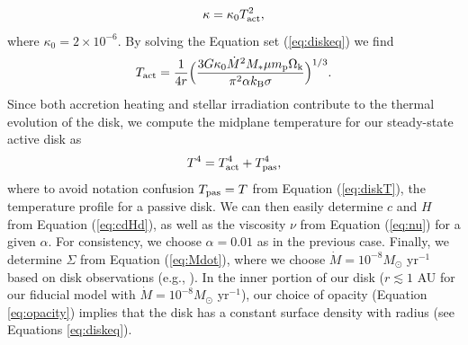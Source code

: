 \documentclass[apj]{emulateapj}
\begin{document}
\begin{equation}
\label{eq:opacity}
\kappa=\kappa_0 T_{\rm act}^2,
\end{equation}
where $\kappa_0=2 \times 10^{-6}$. By solving the Equation set (\ref{eq:diskeq}) we find
\begin{equation}
\label{eq:Tdact}
T_{\rm act}=\frac{1}{4 r} \Big(\frac{3 G \kappa_0\dot{M}^2 M_* \mu m_{\rm p} \Omega_{\rm k}}{\pi^2 \alpha k_{\rm B} \sigma}\Big)^{1/3}.
\end{equation}
Since both accretion heating and stellar irradiation contribute to the thermal evolution of the disk, we compute the midplane temperature for our steady-state active disk as
\begin{equation}
\label{eq:activeT}
T^4 = T_{\rm act}^4 + T_{\rm pas}^4,
\end{equation}
where to avoid notation confusion $T_{\rm pas}=T$ from Equation (\ref{eq:diskT}), the temperature profile for a passive disk. We can then easily determine  $c$ and $H$ from Equation (\ref{eq:cdHd}), as well as the viscosity $\nu$ from Equation (\ref{eq:nu}) for a given $\alpha$. For consistency, we choose  $\alpha=0.01$ as in the previous case. Finally, we determine $\Sigma$ from Equation (\ref{eq:Mdot}), where we choose $\dot{M}=10^{-8} M_{\odot}$ yr$^{-1}$ based on disk observations (e.g., \citealt{andrews10}). In the inner portion of our disk ($r  \lesssim 1$ AU for our fiducial model with $\dot{M}=10^{-8} M_{\odot}$ yr$^{-1}$), our choice of opacity (Equation \ref{eq:opacity}) implies that the disk has a constant surface density with radius (see Equations \ref{eq:diskeq}). %


\end{document}
